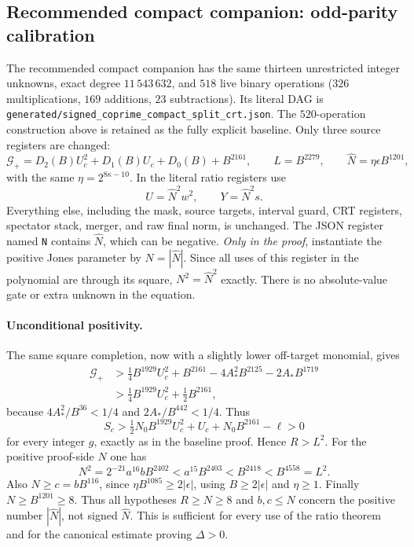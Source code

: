 \subsection{Recommended compact companion: odd-parity calibration}
\label{sec:jones-compact}
The recommended compact companion has the same thirteen unrestricted integer
unknowns, exact degree $11\,543\,632$, and $518$ live binary operations
($326$ multiplications, $169$ additions, $23$ subtractions). Its literal DAG
is \texttt{generated/signed\_coprime\_compact\_split\_crt.json}.
The $520$-operation construction above is retained as the fully explicit
baseline. Only three source registers are changed:
\[
 \mathcal G_+=D_2(B)U_c^2+D_1(B)U_c+D_0(B)+B^{2161},\qquad
 L=B^{2279},\qquad \widehat N=\eta\epsilon B^{1201},
\]
with the same $\eta=2^{8\kappa-10}$. In the literal ratio registers use
\[
 U=\widehat N^2w^2,\qquad Y=\widehat N^2s.
\]
Everything else, including the mask, source targets, interval guard, CRT
registers, spectator stack, merger, and raw final norm, is unchanged.
The JSON register named \texttt{N} contains $\widehat N$, which can be
negative. \emph{Only in the proof}, instantiate the positive Jones parameter
by $N=|\widehat N|$. Since all uses of this register in the polynomial are
through its square, $N^2=\widehat N^2$ exactly. There is no absolute-value
gate or extra unknown in the equation.

\paragraph{Unconditional positivity.}
The same square completion, now with a slightly lower off-target monomial,
gives
\begin{align*}
 \mathcal G_+
 &>\tfrac14 B^{1929}U_c^2+B^{2161}
       -4A_*^2B^{2125}-2A_*B^{1719}\\
 &>\tfrac14 B^{1929}U_c^2+\tfrac12B^{2161},
\end{align*}
because $4A_*^2/B^{36}<1/4$ and $2A_*/B^{442}<1/4$. Thus
\[
 S_c>\tfrac12N_0B^{1929}U_c^2+U_c+N_0B^{2161}-\ell>0
\]
for every integer $g$, exactly as in the baseline proof. Hence $R>L^2$.
For the positive proof-side $N$ one has
\[
 N^2=2^{-21}a^{16}bB^{2402}
       <a^{15}B^{2403}<B^{2418}<B^{4558}=L^2.
\]
Also $N\ge c=bB^{116}$, since
$\eta B^{1085}\ge2|\epsilon|$, using $B\ge2|\epsilon|$ and $\eta\ge1$.
Finally $N\ge B^{1201}\ge8$. Thus all hypotheses $R\ge N\ge8$ and
$b,c\le N$ concern the positive number $|\widehat N|$, not signed
$\widehat N$. This is sufficient for every use of the ratio theorem and for
the canonical estimate proving $\Delta>0$.

